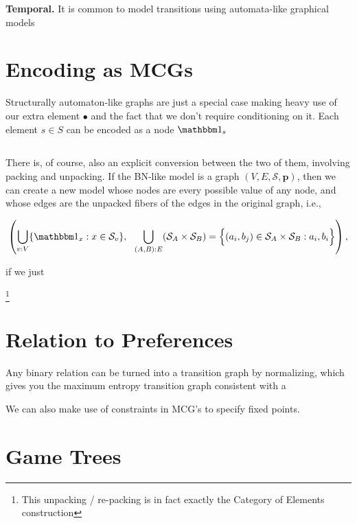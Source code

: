 \documentclass{article}
\begin{document}
	\textbf{Temporal.} It is common to model transitions using automata-like graphical models

	\section{Encoding as MCGs} 
	
	Structurally automaton-like graphs are just a special case making heavy use of our extra element $\bullet$ and the fact that we don't require conditioning on it. Each element $s \in S$ can be encoded as a node $\mathbbm 1_s$
	
%
	\subsection*{}
	There is, of course, also an explicit conversion between the two of them, involving packing and unpacking. If the BN-like model is a graph $(V, E, \mathcal S, \mathbf p)$, then we can create a new model whose nodes are every possible value of any node, and whose edges are the unpacked fibers of the edges in the original graph, i.e.,
	
	\[ \left(\bigcup_{v : V}\{ \mathbbm 1_x : x \in \mathcal S_v\}, ~~ \bigcup_{(A,B) : E}(\mathcal S_A \times \mathcal S_B) = \Big\{(a_i, b_j) \in \mathcal S_A \times \mathcal S_B : a_i, b_i \Big\} \right),  \]
	
	if we just 
	
	\footnote{This unpacking / re-packing is in fact exactly the Category of Elements construction}


	
	\section{Relation to Preferences}
	Any binary relation can be turned into a transition graph by normalizing, which gives you the maximum entropy transition graph consistent with a 
	
	
	We can also make use of constraints in MCG's to specify fixed points.
	
	\section{Game Trees}
	
	
	
	
\end{document}
